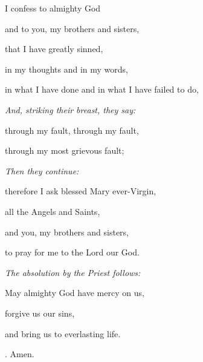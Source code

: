 I confess to almighty God

and to you, my brothers and sisters,

that I have greatly sinned,

in my thoughts and in my words,

in what I have done and in what I have failed to do,

\vspace{5pt} \emph{And, striking their breast, they say:} \vspace{5pt}

through my fault, through my fault,

through my most grievous fault;

\vspace{5pt} \emph{Then they continue:}\vspace{5pt}

therefore I ask blessed Mary ever-Virgin,

all the Angels and Saints,

and you, my brothers and sisters,

to pray for me to the Lord our God.

\vspace{5pt} \emph{The absolution by the Priest follows:}\vspace{5pt}

May almighty God have mercy on us,

forgive us our sins,

and bring us to everlasting life.

\Rbar. Amen.
